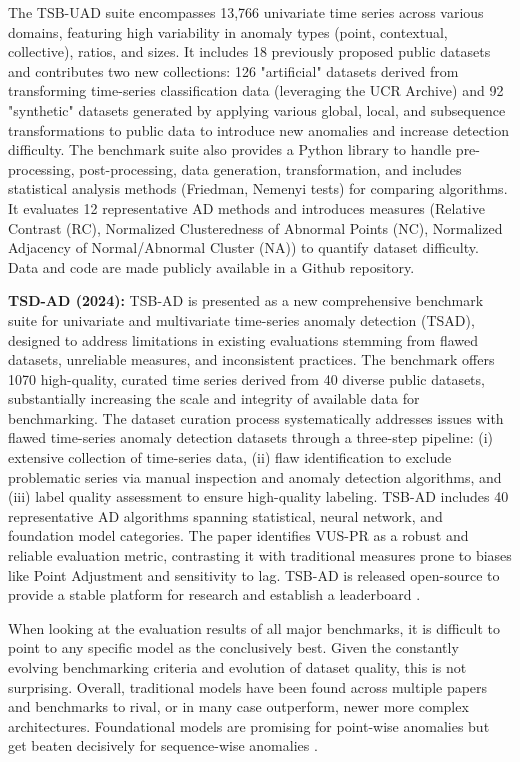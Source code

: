 \documentclass[12pt,oneside]{article}
\begin{document}
The TSB-UAD suite encompasses 13,766 univariate time series across various domains, featuring high variability in anomaly types (point, contextual, collective), ratios, and sizes. It includes 18 previously proposed public datasets and contributes two new collections: 126 "artificial" datasets derived from transforming time-series classification data (leveraging the UCR Archive) and 92 "synthetic" datasets generated by applying various global, local, and subsequence transformations to public data to introduce new anomalies and increase detection difficulty. The benchmark suite also provides a Python library to handle pre-processing, post-processing, data generation, transformation, and includes statistical analysis methods (Friedman, Nemenyi tests) for comparing algorithms. It evaluates 12 representative AD methods and introduces measures (Relative Contrast (RC), Normalized Clusteredness of Abnormal Points (NC), Normalized Adjacency of Normal/Abnormal Cluster (NA)) to quantify dataset difficulty. Data and code are made publicly available in a Github repository. \par
\textbf{TSD-AD (2024):} TSB-AD is presented as a new comprehensive benchmark suite for univariate and multivariate time-series anomaly detection (TSAD), designed to address limitations in existing evaluations stemming from flawed datasets, unreliable measures, and inconsistent practices. The benchmark offers 1070 high-quality, curated time series derived from 40 diverse public datasets, substantially increasing the scale and integrity of available data for benchmarking. The dataset curation process systematically addresses issues with flawed time-series anomaly detection datasets through a three-step pipeline: (i) extensive collection of time-series data, (ii) flaw identification to exclude problematic series via manual inspection and anomaly detection algorithms, and (iii) label quality assessment to ensure high-quality labeling. TSB-AD includes 40 representative AD algorithms spanning statistical, neural network, and foundation model categories. The paper identifies VUS-PR as a robust and reliable evaluation metric, contrasting it with traditional measures prone to biases like Point Adjustment and sensitivity to lag.
TSB-AD is released open-source to provide a stable platform for research and establish a leaderboard \parencites{liu2024elephant}.

When looking at the evaluation results of all major benchmarks, it is difficult to point to any specific model as the conclusively best. Given the constantly evolving benchmarking criteria and evolution of dataset quality, this is not surprising. Overall, traditional models have been found across multiple papers and benchmarks to rival, or in many case outperform, newer more complex architectures. Foundational models are promising for point-wise anomalies but get beaten decisively for sequence-wise anomalies \parencites[pp.~9-10]{liu2024elephant}[p.~1706]{paparrizos2022tsb}.
\end{document}
